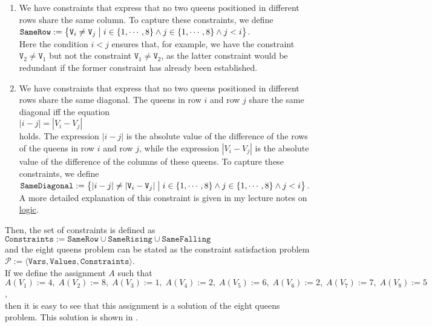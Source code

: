 \begin{enumerate}
\item We have constraints that express that no two queens positioned in different rows share the same column.
      To capture these constraints, we define
      \\[0.2cm]
      \hspace*{1.3cm}
      $\texttt{SameRow} := \bigl\{ \texttt{V}_i \not= \texttt{V}_j \bigm| i \in \{1,\cdots,8\} \wedge j \in \{1,\cdots,8\} \wedge j < i \bigr\}$.
      \\[0.2cm]
      Here the condition $i < j$ ensures that, for example, we have the constraint $\texttt{V}_2 \not= \texttt{V}_1$
      but not the constraint  $\texttt{V}_1 \not= \texttt{V}_2$, as the latter constraint would be redundant if
      the former constraint has already been established.
\item We have constraints that express that no two queens positioned in different rows share the same 
      diagonal.  The queens in row $i$ and row $j$ share the same diagonal iff the equation
      \\[0.2cm]
      \hspace*{1.3cm}
      $|i - j| = |V_i - V_j|$
      \\[0.2cm]
      holds.  The expression $|i-j|$ is the absolute value of the difference of the rows of the queens in row
      $i$ and row $j$,  while the expression $|V_i - V_j|$ is the absolute value of the difference of the
      columns of these queens.  To capture these constraints, we define
      \\[0.2cm]
      \hspace*{1.3cm}
      $\texttt{SameDiagonal} := \bigl\{ |i  - j| \not= |\texttt{V}_i - \texttt{V}_j| \bigm| i \in \{1,\cdots,8\} \wedge j \in \{1,\cdots,8\} \wedge j < i \bigr\}$.
      \\[0.2cm]
      A more detailed explanation of this constraint is given in my lecture notes on 
      \href{https://github.com/karlstroetmann/Logik/blob/master/Lecture-Notes/logic.pdf}{logic}.
\end{enumerate}
Then, the set of constraints is defined as 
\\[0.2cm]
\hspace*{1.3cm}
$\texttt{Constraints} := \texttt{SameRow} \cup \texttt{SameRising} \cup \texttt{SameFalling}$
\\[0.2cm]
and the eight queens problem can be stated as the constraint satisfaction problem
\\[0.2cm]
\hspace*{1.3cm}
$\mathcal{P} := \langle \texttt{Vars}, \texttt{Values}, \texttt{Constraints} \rangle$.
\\[0.2cm]
If we define the assignment $A$ such that
\\[0.2cm]
\hspace*{1.3cm}
$A(V_1) := 4,\; A(V_2) := 8,\; A(V_3) := 1,\; A(V_4) := 2,\; A(V_5) := 6,\; A(V_6) := 2,\; A(V_7) := 7,\; A(V_8) := 5$,
\\[0.2cm]
then it is easy to see that this assignment is a solution of the eight queens problem.  This solution is shown
in .



